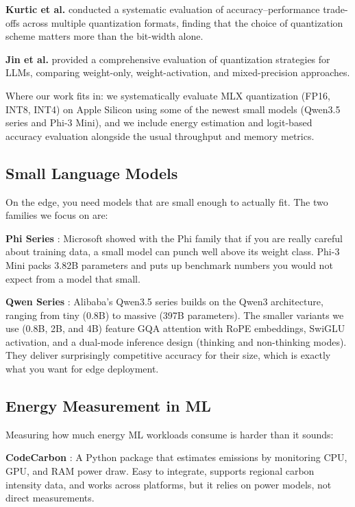 \documentclass[11pt,a4paper]{article}
\begin{document}
\textbf{Kurtic et al.} \cite{kurtic2024give} conducted a systematic evaluation of accuracy--performance trade-offs across multiple quantization formats, finding that the choice of quantization scheme matters more than the bit-width alone.

\textbf{Jin et al.} \cite{jin2024comprehensive} provided a comprehensive evaluation of quantization strategies for LLMs, comparing weight-only, weight-activation, and mixed-precision approaches.

Where our work fits in: we systematically evaluate MLX quantization (FP16, INT8, INT4) on Apple Silicon using some of the newest small models (Qwen3.5 series and Phi-3 Mini), and we include energy estimation and logit-based accuracy evaluation alongside the usual throughput and memory metrics.

\subsection{Small Language Models}

On the edge, you need models that are small enough to actually fit. The two families we focus on are:

\textbf{Phi Series} \cite{javaheripi2023phi2, abdin2024phi3}: Microsoft showed with the Phi family that if you are really careful about training data, a small model can punch well above its weight class. Phi-3 Mini packs 3.82B parameters and puts up benchmark numbers you would not expect from a model that small.

\textbf{Qwen Series} \cite{qwen2025technical}: Alibaba's Qwen3.5 series builds on the Qwen3 architecture, ranging from tiny (0.8B) to massive (397B parameters). The smaller variants we use (0.8B, 2B, and 4B) feature GQA attention with RoPE embeddings, SwiGLU activation, and a dual-mode inference design (thinking and non-thinking modes). They deliver surprisingly competitive accuracy for their size, which is exactly what you want for edge deployment.

\subsection{Energy Measurement in ML}

Measuring how much energy ML workloads consume is harder than it sounds:

\textbf{CodeCarbon} \cite{codecarbon2023}: A Python package that estimates emissions by monitoring CPU, GPU, and RAM power draw. Easy to integrate, supports regional carbon intensity data, and works across platforms, but it relies on power models, not direct measurements.
\end{document}
